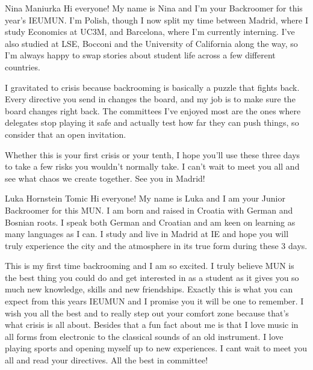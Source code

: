 \begin{chairletter}{Nina Maniurka}
Hi everyone! My name is Nina and I'm your Backroomer for this year's IEUMUN. I'm Polish, though I now split my time between Madrid, where I study Economics at UC3M, and Barcelona, where I'm currently interning. I've also studied at LSE, Bocconi and the University of California along the way, so I'm always happy to swap stories about student life across a few different countries.

I gravitated to crisis because backrooming is basically a puzzle that fights back. Every directive you send in changes the board, and my job is to make sure the board changes right back. The committees I've enjoyed most are the ones where delegates stop playing it safe and actually test how far they can push things, so consider that an open invitation.

Whether this is your first crisis or your tenth, I hope you'll use these three days to take a few risks you wouldn't normally take. I can't wait to meet you all and see what chaos we create together. See you in Madrid!

\end{chairletter}

\begin{chairletter}{Luka Hornstein Tomic}
Hi everyone! My name is Luka and I am your Junior Backroomer for this MUN. I am born and raised in Croatia with German and Bosnian roots. I speak both German and Croatian and am keen on learning as many languages as I can. I study and live in Madrid at IE and hope you will truly experience the city and the atmosphere in its true form during these 3 days.

This is my first time backrooming and I am so excited. I truly believe MUN is the best thing you could do and get interested in as a student as it gives you so much new knowledge, skills and new friendships. Exactly this is what you can expect from this years IEUMUN and I promise you it will be one to remember. I wish you all the best and to really step out your comfort zone because that’s what crisis is all about. Besides that a fun fact about me is that I love music in all forms from electronic to the classical sounds of an old instrument. I love playing sports and opening myself up to new experiences. I cant wait to meet you all and read your directives. All the best in committee!

\end{chairletter}

